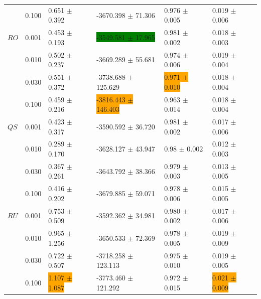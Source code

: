 \documentclass[shortabstract]{iithesis}
\begin{document}
\begin{table}[!ht]
\begin{tabular}{llllll}
        & 0.100 &  0.651 $\pm$ 0.392 &   -3670.398 $\pm$ 71.306 &  0.976 $\pm$ 0.005 &  0.019 $\pm$ 0.006 \\
$RO$ & 0.001 &  0.453 $\pm$ 0.193 &   \colorbox{green}{-3549.581 $\pm$ 17.965} &  0.981 $\pm$ 0.002 &  0.018 $\pm$ 0.003 \\
        & 0.010 &  0.502 $\pm$ 0.237 &   -3669.289 $\pm$ 55.681 &  0.974 $\pm$ 0.006 &  0.019 $\pm$ 0.004 \\
        & 0.030 &  0.551 $\pm$ 0.372 &  -3738.688 $\pm$ 125.629 &   \colorbox{orange}{0.971 $\pm$ 0.010} &  0.018 $\pm$ 0.004 \\
        & 0.100 &  0.459 $\pm$ 0.216 &  \colorbox{orange}{-3816.443 $\pm$ 146.403} &  0.963 $\pm$ 0.014 &  0.018 $\pm$ 0.004 \\
$QS$ & 0.001 &  0.423 $\pm$ 0.317 &    -3590.592 $\pm$ 36.720 &  0.981 $\pm$ 0.002 &  0.017 $\pm$ 0.006 \\
        & 0.010 &   0.289 $\pm$ 0.170 &   -3628.127 $\pm$ 43.947 &   0.98 $\pm$ 0.002 &  0.012 $\pm$ 0.003 \\
        & 0.030 &  0.367 $\pm$ 0.261 &   -3643.792 $\pm$ 38.366 &  0.979 $\pm$ 0.003 &  0.013 $\pm$ 0.005 \\
        & 0.100 &  0.416 $\pm$ 0.202 &   -3679.885 $\pm$ 59.071 &  0.978 $\pm$ 0.006 &  0.015 $\pm$ 0.005 \\
$RU$ & 0.001 &  0.753 $\pm$ 0.509 &   -3592.362 $\pm$ 34.981 &   0.980 $\pm$ 0.002 &  0.017 $\pm$ 0.006 \\
        & 0.010 &  0.965 $\pm$ 1.256 &   -3650.533 $\pm$ 72.369 &  0.978 $\pm$ 0.005 &  0.019 $\pm$ 0.009 \\
        & 0.030 &  0.722 $\pm$ 0.507 &  -3718.258 $\pm$ 123.113 &   0.975 $\pm$ 0.010 &  0.019 $\pm$ 0.005 \\
        & 0.100 &  \colorbox{orange}{1.107 $\pm$ 1.087} &   -3773.460 $\pm$ 121.292 &  0.972 $\pm$ 0.015 &  \colorbox{orange}{0.021 $\pm$ 0.009} \\
\hline
\end{tabular}
\label{tab:res_0_16}
\end{table}

\pagebreak 
\end{document}
